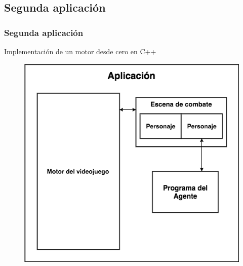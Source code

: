 \documentclass{beamer}
\begin{document}
\subsection{Segunda aplicación}
\begin{frame}
\frametitle{Segunda aplicación}
Implementación de un motor desde cero en C++

\begin{figure}
	\includegraphics[scale=0.3]{../otros/otrasCapturas/block.png} 
\end{figure}

\note{
	
}
\end{frame}
\end{document}
